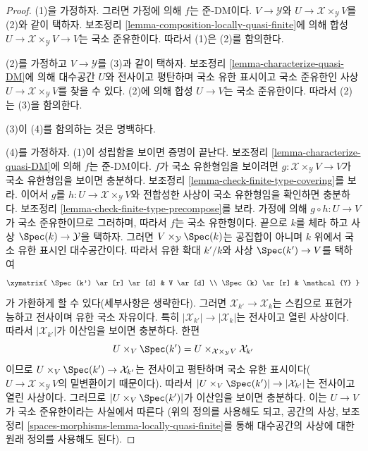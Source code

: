 \begin{proof}
(1)을 가정하자. 그러면 가정에 의해 $f$는 준-DM이다.
$V \to \mathcal{Y}$와 $U \to \mathcal{X} \times_\mathcal{Y} V$를
(2)와 같이 택하자. 보조정리
\ref{lemma-composition-locally-quasi-finite}에 의해 합성
$U \to \mathcal{X} \times_\mathcal{Y} V \to V$는 국소 준유한이다.
따라서 (1)은 (2)를 함의한다.

\medskip\noindent
(2)를 가정하고 $V \to \mathcal{Y}$를 (3)과 같이 택하자. 보조정리
\ref{lemma-characterize-quasi-DM}에 의해 대수공간 $U$와 전사이고
평탄하며 국소 유한 표시이고 국소 준유한인 사상
$U \to \mathcal{X} \times_\mathcal{Y} V$를 찾을 수 있다. (2)에 의해 합성
$U \to V$는 국소 준유한이다. 따라서 (2)는 (3)을 함의한다.

\medskip\noindent
(3)이 (4)를 함의하는 것은 명백하다.

\medskip\noindent
(4)를 가정하자. (1)이 성립함을 보이면 증명이 끝난다. 보조정리
\ref{lemma-characterize-quasi-DM}에 의해 $f$는 준-DM이다. $f$가 국소
유한형임을 보이려면 $g : \mathcal{X} \times_\mathcal{Y} V \to V$가
국소 유한형임을 보이면 충분하다. 보조정리
\ref{lemma-check-finite-type-covering}를 보라. 이어서 $g$를
$h : U \to \mathcal{X} \times_\mathcal{Y} V$와 전합성한 사상이 국소
유한형임을 확인하면 충분하다. 보조정리
\ref{lemma-check-finite-type-precompose}를 보라. 가정에 의해
$g \circ h : U \to V$가 국소 준유한이므로 그러하며, 따라서 $f$는 국소
유한형이다. 끝으로 $k$를 체라 하고 사상
$\Spec(k) \to \mathcal{Y}$을 택하자. 그러면
$V \times_\mathcal{Y} \Spec(k)$는 공집합이 아니며 $k$ 위에서 국소 유한
표시인 대수공간이다. 따라서 유한 확대 $k'/k$와 사상
$\Spec(k') \to V$를 택하여
$$
\xymatrix{
\Spec(k') \ar[r] \ar[d] & V \ar[d] \\
\Spec(k) \ar[r] & \mathcal{Y}
}
$$
가 가환하게 할 수 있다(세부사항은 생략한다). 그러면
$\mathcal{X}_{k'} \to \mathcal{X}_k$는 스킴으로 표현가능하고 전사이며
유한 국소 자유이다. 특히
$|\mathcal{X}_{k'}| \to |\mathcal{X}_k|$는 전사이고 열린 사상이다.
따라서 $|\mathcal{X}_{k'}|$가 이산임을 보이면 충분하다. 한편
$$
U \times_V \Spec(k') =
U \times_{\mathcal{X} \times_\mathcal{Y} V} \mathcal{X}_{k'}
$$
이므로 $U \times_V \Spec(k') \to \mathcal{X}_{k'}$는 전사이고 평탄하며
국소 유한 표시이다($U \to \mathcal{X} \times_\mathcal{Y} V$의 밑변환이기
때문이다). 따라서 $|U \times_V \Spec(k')| \to |\mathcal{X}_{k'}|$는
전사이고 열린 사상이다. 그러므로 $|U \times_V \Spec(k')|$가 이산임을
보이면 충분하다. 이는 $U \to V$가 국소 준유한이라는 사실에서 따른다
(위의 정의를 사용해도 되고, 공간의 사상, 보조정리
\ref{spaces-morphisms-lemma-locally-quasi-finite}를 통해 대수공간의
사상에 대한 원래 정의를 사용해도 된다).
\end{proof}

